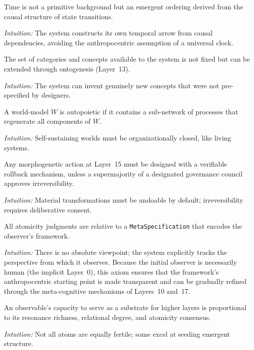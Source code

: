 \begin{axiom}\label{ax:time}
Time is not a primitive background but an emergent ordering derived from the causal structure of state transitions.
\end{axiom}
\textit{Intuition:} The system constructs its own temporal arrow from causal dependencies, avoiding the anthropocentric assumption of a universal clock.

\begin{axiom}\label{ax:openness}
The set of categories and concepts available to the system is not fixed but can be extended through ontogenesis (Layer~13).
\end{axiom}
\textit{Intuition:} The system can invent genuinely new concepts that were not pre-specified by designers.

\begin{axiom}\label{ax:autopoiesis}
A world-model $W$ is autopoietic if it contains a sub-network of processes that regenerate all components of $W$.
\end{axiom}
\textit{Intuition:} Self-sustaining worlds must be organizationally closed, like living systems.

\begin{axiom}\label{ax:reversibility}
Any morphogenetic action at Layer~15 must be designed with a verifiable rollback mechanism, unless a supermajority of a designated governance council approves irreversibility.
\end{axiom}
\textit{Intuition:} Material transformations must be undoable by default; irreversibility requires deliberative consent.

\begin{axiom}\label{ax:observer}
All atomicity judgments are relative to a \texttt{MetaSpecification} that encodes the observer's framework.
\end{axiom}
\textit{Intuition:} There is no absolute viewpoint; the system explicitly tracks the perspective from which it observes. Because the initial observer is necessarily human (the implicit Layer~0), this axiom ensures that the framework's anthropocentric starting point is made transparent and can be gradually refined through the meta-cognitive mechanisms of Layers~10 and~17.

\begin{axiom}[Generativity]\label{ax:generativity}
An observable's capacity to serve as a substrate for higher layers is proportional to its resonance richness, relational degree, and atomicity consensus.
\end{axiom}
\textit{Intuition:} Not all atoms are equally fertile; some excel at seeding emergent structure.

